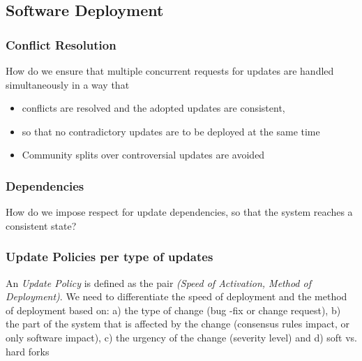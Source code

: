 
\subsection*{Software Deployment}
\subsubsection*{Conflict Resolution}
How do we ensure that multiple concurrent requests for updates are handled simultaneously in a way that
\begin{itemize}
\item conflicts are resolved and the adopted updates are consistent, 
\item so that no contradictory updates are to be deployed at the same time
\item Community splits over controversial updates are avoided
\end{itemize}

\subsubsection*{Dependencies}
How do we impose respect for update dependencies, so that the system reaches a consistent state? 

\subsubsection*{Update Policies per type of updates}
An \emph{Update Policy} is defined as the pair \emph{(Speed of Activation, Method of Deployment)}. We need to differentiate the speed of deployment and the method of deployment based on: a) the type of change (bug -fix or change request), b) the part of the system that is affected by the change (consensus rules impact, or only software impact), c) the urgency of the change (severity level)
and d) soft vs. hard forks


